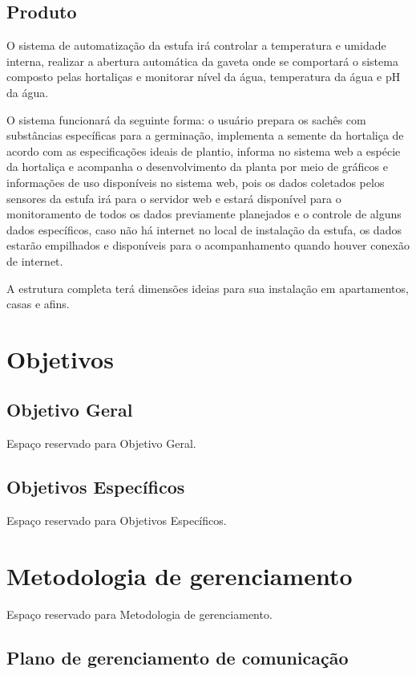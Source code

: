 \subsection{Produto}

O sistema de automatização da estufa irá controlar a temperatura e umidade interna, realizar a abertura automática da gaveta onde se comportará o sistema composto pelas hortaliças e monitorar nível da água, temperatura da água e pH da água.

O sistema funcionará da seguinte forma: o usuário prepara os sachês com substâncias específicas para a germinação, implementa a semente da hortaliça de acordo com as especificações ideais de plantio, informa no sistema web a espécie da hortaliça e acompanha o desenvolvimento da planta por meio de gráficos e informações de uso disponíveis no sistema web, pois os dados coletados pelos sensores da estufa irá para o servidor web e estará disponível para o monitoramento de todos os dados previamente planejados e o controle de alguns dados específicos, caso não há internet no local de instalação da estufa, os dados estarão empilhados e disponíveis para o acompanhamento quando houver conexão de internet.

A estrutura completa terá dimensões ideias para sua instalação em apartamentos, casas e afins.
\section{Objetivos}

\subsection{Objetivo Geral}

Espaço reservado para Objetivo Geral.

\subsection{Objetivos Específicos}

Espaço reservado para Objetivos Específicos.

\section{Metodologia de gerenciamento}

Espaço reservado para Metodologia de gerenciamento.

\subsection{Plano de gerenciamento de comunicação}

